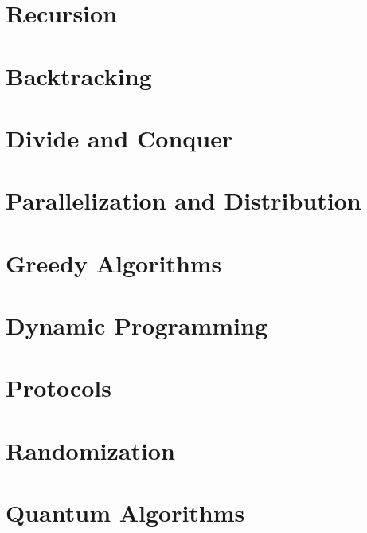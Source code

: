 \documentclass{book}
\begin{document}
\chapter{Recursion}
%
\chapter{Backtracking}


\chapter{Divide and Conquer}
 
\chapter{Parallelization and Distribution}


\chapter{Greedy Algorithms}


\chapter{Dynamic Programming}

\chapter{Protocols}

\chapter{Randomization}

\chapter{Quantum Algorithms}
\end{document}
